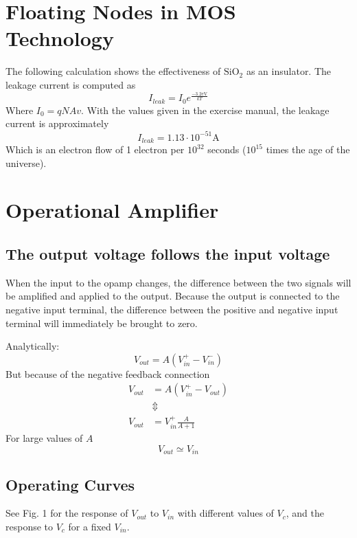 


\newpage
\section{Floating Nodes in MOS Technology}
The following calculation shows the effectiveness of \(\mathrm{SiO}_2\) as an insulator. The leakage current is computed as
\begin{equation*}
    I_{leak} = I_0e^{\frac{-3.2 \mathrm{eV}}{kT}}
\end{equation*}
Where \(I_0 = qNAv\). With the values given in the exercise manual, the leakage current is approximately
\begin{equation*}
    I_{leak} = 1.13 \cdot 10^{-51} \mathrm{A}
\end{equation*}
Which is an electron flow of 1 electron per \(10^{32}\) seconds (\(10^{15}\) times the age of the universe).

\section{Operational Amplifier}
\subsection{The output voltage follows the input voltage}
When the input to the opamp changes, the difference between the two signals will be amplified and applied to the output.
Because the output is connected to the negative input terminal, the difference between the positive and negative input terminal
will immediately be brought to zero.

Analytically:
\begin{equation*}
    V_{out} = A(V_{in}^+ - V_{in}^-)
\end{equation*}
But because of the negative feedback connection
\begin{align*}
    V_{out} &= A(V_{in}^+ - V_{out}) \\
            &\Updownarrow \\
    V_{out} &= V_{in}^+ \frac{A}{A+1}
\end{align*}
For large values of \(A\)
\begin{equation*}
    V_{out} \simeq V_{in}
\end{equation*}

\subsection{Operating Curves}
See Fig. 1 for the response of \(V_{out}\) to \(V_{in}\) with different values of \(V_c\), and the response to \(V_c\) for a fixed \(V_{in}\).

